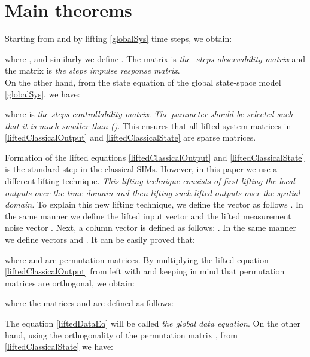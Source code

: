 \documentclass[journal,10pt]{IEEEtran}
\begin{document}
\section{Main theorems}
\label{mainTheorems}
Starting from  and by lifting \eqref{globalSys}  time steps, we obtain:
\begin{small}

\end{small}
where ,  and similarly we define . The matrix  is \textit{the -steps observability matrix} and the matrix  is \textit{the  steps impulse response matrix}\cite{verhaegen2007}. \\
On the other hand, from the state equation of the global state-space model \eqref{globalSys}, we have:
\begin{small}

\end{small}
where  is \textit{the  steps controllability matrix}. \textit{The parameter  should be selected such that it is much smaller than  ()}. This ensures that all lifted system matrices in \eqref{liftedClassicalOutput} and \eqref{liftedClassicalState} are sparse matrices.
\par
 Formation of the lifted equations \eqref{liftedClassicalOutput} and \eqref{liftedClassicalState} is the standard step in the classical SIMs. However, in this paper we use a different lifting technique. \textit{This lifting technique consists of first lifting the local outputs over the time domain and then lifting such lifted outputs over the spatial domain.} To explain this new lifting technique, we define the vector  as follows . In the same manner we define the lifted input vector  and the lifted measurement noise vector . Next, a column vector  is defined as follows: . In the same manner we define vectors  and . It can be easily proved that:
\begin{small}

\end{small}
where  and  are permutation matrices. By multiplying the lifted equation \eqref{liftedClassicalOutput} from left with  and keeping in mind that permutation matrices are orthogonal, we obtain:
\begin{small}

\end{small}
where the matrices  and  are defined as follows:
\begin{small}

\end{small}
The equation \eqref{liftedDataEq} will be called \textit{the global data equation}. On the other hand, using the orthogonality of the permutation matrix , from \eqref{liftedClassicalState} we have:
\end{document}
